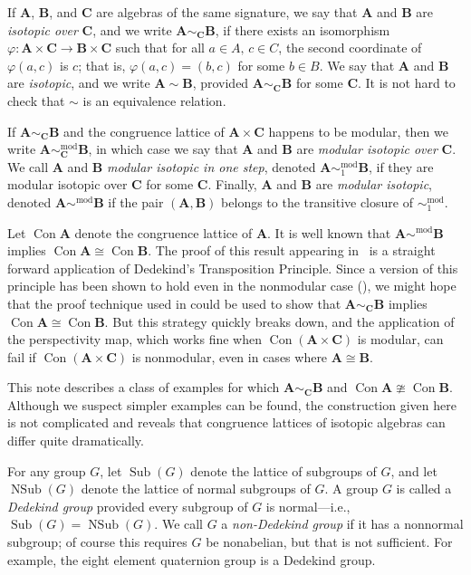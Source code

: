 \documentclass{au}
\theoremstyle{plain}
\theoremstyle{definition}
\theoremstyle{remark}
\newcommand{\<}{\ensuremath{\langle}}
\renewcommand{\>}{\ensuremath{\rangle}}
\renewcommand{\phi}{\ensuremath{\varphi}}
\newcommand{\bA}{\ensuremath{\mathbf{A}}}
\newcommand{\bB}{\ensuremath{\mathbf{B}}}
\newcommand{\bC}{\ensuremath{\mathbf{C}}}
\newcommand{\Con}{\ensuremath{\operatorname{Con}}}
\newcommand{\Sub}{\ensuremath{\operatorname{Sub}}}
\newcommand{\NSub}{\ensuremath{\operatorname{NSub}}}
\renewcommand{\phi}{\ensuremath{\varphi}}
\begin{document}
If $\bA$, $\bB$, and $\bC$ are algebras of the same signature, we say that
$\bA$ and $\bB$ are \emph{isotopic over} $\bC$, and we write $\bA\sim_{\bC}\bB$,
if there exists an isomorphism $\phi: \bA \times \bC \rightarrow \bB \times \bC$ such that 
for all $a\in A,\, c\in C$, the second coordinate of $\phi(a,c)$ is $c$; that
is, $\phi(a,c) = (b,c)$ for some $b\in B$.
We say that $\bA$ and $\bB$ are \emph{isotopic}, and we write $\bA\sim \bB$, provided
$\bA\sim_{\bC}\bB$ for some $\bC$.  It is not hard to check that $\sim$ is an
equivalence relation.

If $\bA\sim_{\bC}\bB$ and the congruence lattice of $\bA \times \bC$ happens to
be modular, then we write $\bA \sim^{\mathrm{mod}}_{\bC} \bB$, in which case we say that
$\bA$ and $\bB$ are \emph{modular isotopic over} $\bC$.
We call $\bA$ and $\bB$ \emph{modular isotopic in one step},  denoted 
$\bA \sim^{\mathrm{mod}}_1 \bB$,
if they are modular isotopic over $\bC$ for some $\bC$. Finally, 
$\bA$ and $\bB$ are \emph{modular isotopic}, denoted 
$\bA \sim^{\mathrm{mod}} \bB$ if the pair $(\bA, \bB)$ belongs to the transitive
closure of $\sim^{\mathrm{mod}}_1$.

Let $\Con \bA$ denote the congruence lattice of $\bA$.  It is well known that
$\bA \sim^{\mathrm{mod}} \bB$ implies $\Con \bA \cong \Con \bB$.  The proof
of this result appearing in~\cite{alvi:1987} 
is a straight forward application of Dedekind's Transposition Principle.  
Since a version of this principle has been shown to 
hold even in the nonmodular case (\cite{DTP}), we might hope that the
proof technique used in \cite{alvi:1987} could be used to show that  
$\bA\sim_{\bC}\bB$ implies $\Con \bA \cong \Con \bB$.  But this strategy quickly
breaks down, and the application of the perspectivity map, which works fine when
$\Con (\bA\times \bC)$ is modular, can fail if
$\Con (\bA\times \bC)$ is nonmodular, even in cases where $\bA \cong \bB$. 

This note describes a class of examples for which $\bA\sim_{\bC}\bB$ and $\Con \bA
\ncong \Con \bB$. Although we suspect simpler examples can be found, the
construction given here is not complicated and reveals that congruence lattices of
isotopic algebras can differ quite dramatically.

For any group $G$, let $\Sub(G)$ denote the lattice of subgroups of $G$, and
let $\NSub(G)$ denote the lattice of normal subgroups of $G$.
A group $G$ is called a \emph{Dedekind group} provided every subgroup of $G$ is
normal---i.e., $\Sub(G) = \NSub(G)$.  
We call $G$ a \emph{non-Dedekind group} if it has a nonnormal subgroup; of
course this requires $G$ be nonabelian, but that is not
sufficient.  For example, the eight element quaternion group 
is a Dedekind group.
\end{document}
